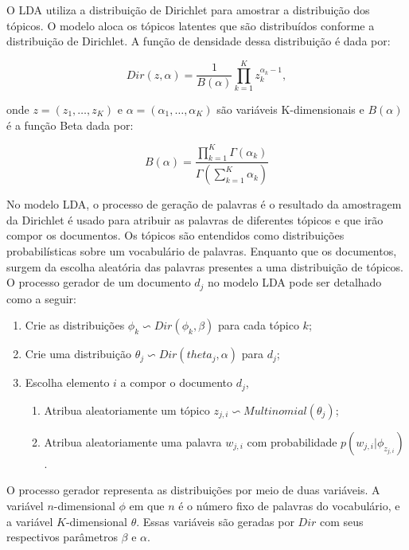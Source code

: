 O LDA utiliza a distribuição de Dirichlet para amostrar a distribuição dos tópicos. O modelo aloca os tópicos latentes que são distribuídos conforme a distribuição de Dirichlet. A função de densidade dessa distribuição é dada por:


\begin{equation}
Dir(z, \alpha) = \frac{1}{B(\alpha)} \prod_{k=1}^K z_k^{\alpha_k-1} , 
\end{equation}

onde $z = (z_1,\dots, z_K )$ e $\alpha = (\alpha_1,\dots,\alpha_K)$  são variáveis K-dimensionais e $B(\alpha)$ é a função Beta dada por:

\begin{equation}
	B(\alpha) = \frac{\prod_{k=1}^K \Gamma(\alpha_k)}{\Gamma(\sum_{k=1}^K \alpha_k)}
\end{equation} 



No modelo LDA, o processo de geração de palavras é o resultado da amostragem da Dirichlet é usado para atribuir as palavras de diferentes tópicos e que irão compor os documentos. 
%
Os tópicos são entendidos como distribuições probabilísticas sobre um vocabulário de palavras. Enquanto que os documentos, surgem da escolha aleatória das palavras presentes a uma distribuição de tópicos.
%
O processo gerador de um documento $d_j$ no modelo LDA pode ser detalhado como a seguir: 

\begin{enumerate}
	\item Crie as distribuições $\phi_k \backsim Dir(\phi_k, \beta)$ para cada tópico $k$;
	\item Crie uma distribuição $\theta_j \backsim Dir(theta_j,\alpha)$ para $d_j$;
	\item Escolha elemento $i$ a compor o documento $d_j$,
		\begin{enumerate}
			\item Atribua aleatoriamente um tópico $z_{j,i}\backsim Multinomial(\theta_j)$;
			\item Atribua aleatoriamente uma palavra $w_{j,i}$ com probabilidade $p(w_{j,i}|\phi_{z_{j,i}})$.
		\end{enumerate}
	
\end{enumerate}


O processo gerador representa as distribuições por meio de duas variáveis. A variável $n$-dimensional $\phi$ em que $n$ é o número fixo de palavras do vocabulário, e a variável $K$-dimensional $\theta$. Essas variáveis são geradas por $Dir$ com seus respectivos parâmetros $\beta$ e $\alpha$.

